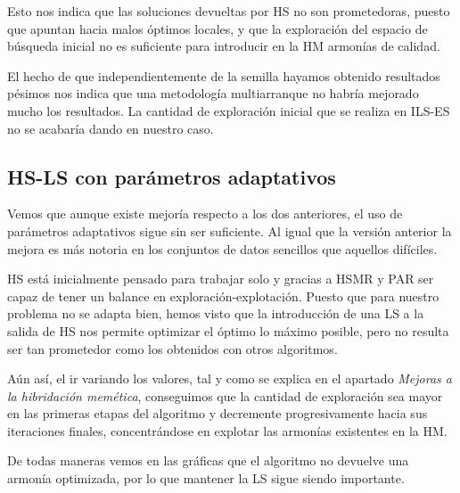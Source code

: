 Esto nos indica que las soluciones devueltas por HS no son prometedoras, puesto que apuntan hacia malos óptimos locales, y que la exploración del espacio de búsqueda inicial no es suficiente para introducir en la HM armonías de calidad.

\vspace{\baselineskip}

El hecho de que independientemente de la semilla hayamos obtenido resultados pésimos nos indica que una metodología multiarranque no habría mejorado mucho los resultados. La cantidad de exploración inicial que se realiza en ILS-ES no se acabaría dando en nuestro caso.

\subsection{HS-LS con parámetros adaptativos}

Vemos que aunque existe mejoría respecto a los dos anteriores, el uso de parámetros adaptativos sigue sin ser suficiente. Al igual que la versión anterior la mejora es más notoria en los conjuntos de datos sencillos que aquellos difíciles. 

HS está inicialmente pensado para trabajar solo y gracias a HSMR y PAR ser capaz de tener un balance en exploración-explotación. Puesto que para nuestro problema no se adapta bien, hemos visto que la introducción de una LS a la salida de HS nos permite optimizar el óptimo lo máximo posible, pero no resulta ser tan prometedor como los obtenidos con otros algoritmos.

\vspace{\baselineskip}

Aún así, el ir variando los valores, tal y como se explica en el apartado \textit{Mejoras a la hibridación memética}, conseguimos que la cantidad de exploración sea mayor en las primeras etapas del algoritmo y decremente progresivamente hacia sus iteraciones finales, concentrándose en explotar las armonías existentes en la HM.

De todas maneras vemos en las gráficas que el algoritmo no devuelve una armonía optimizada, por lo que mantener la LS sigue siendo importante.

\vspace{\baselineskip}
\vspace{\baselineskip}


